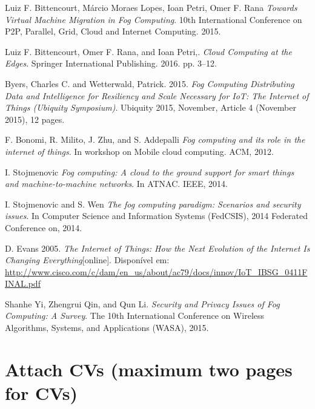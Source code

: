 \documentclass[a4paper, 11pt]{article}
\begin{document}
\begin{thebibliography}{9}

 Luiz F. Bittencourt, Márcio Moraes Lopes, Ioan Petri, Omer F. Rana \emph{Towards Virtual Machine Migration in Fog Computing}. 10th International Conference on P2P, Parallel, Grid, Cloud and Internet Computing. 2015.

 Luiz F. Bittencourt, Omer F. Rana, and Ioan Petri,. \emph{Cloud Computing at the Edges}. Springer International Publishing. 2016. pp. 3–12.

  Byers, Charles C. and Wetterwald, Patrick. 2015. \emph{Fog Computing Distributing Data and Intelligence for Resiliency and Scale Necessary for IoT: The Internet of Things (Ubiquity Symposium)}. Ubiquity 2015, November, Article 4 (November 2015), 12 pages.

 F. Bonomi, R. Milito, J. Zhu, and S. Addepalli \emph{Fog computing and its role in the internet of things}. In workshop on Mobile cloud computing. ACM, 2012.

 I. Stojmenovic \emph{Fog computing: A cloud to the ground support for smart things and machine-to-machine networks}. In ATNAC. IEEE, 2014.

 I. Stojmenovic and S. Wen \emph{The fog computing paradigm: Scenarios and security issues}. In Computer Science and Information Systems (FedCSIS), 2014 Federated Conference on, 2014.

  D. Evans 2005. \emph{The Internet of Things: How the Next Evolution of the Internet Is Changing Everything}[online]. Disponível em: \url{http://www.cisco.com/c/dam/en_us/about/ac79/docs/innov/IoT_IBSG_0411FINAL.pdf}

  Shanhe Yi, Zhengrui Qin, and Qun Li. \emph{Security and Privacy Issues of Fog Computing: A Survey}. The 10th International Conference on Wireless Algorithms, Systems, and Applications (WASA), 2015.





\end{thebibliography}
	
	\section{Attach CVs (maximum two pages for CVs)}
	
\end{document}

